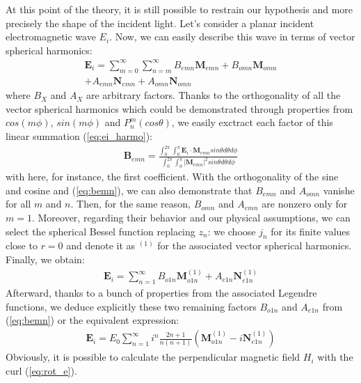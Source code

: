 \documentclass{article}
\numberwithin{equation}{section}
\begin{document}
At this point of the theory, it is still possible to restrain our hypothesis and more precisely the shape of the incident light. Let's consider a planar incident electromagnetic wave $E_{i}$. Now, we can easily describe this wave in terms of vector spherical harmonics:
\begin{equation}\label{eq:ei_harmo}
\begin{aligned}
\textbf{E}_{i}=\sum_{m=0}^{\infty }\sum_{n=m}^{\infty }B_{emn}\textbf{M}_{emn}+B_{omn}\textbf{M}_{omn}\\
+A_{emn}\textbf{N}_{emn}+A_{omn}\textbf{N}_{omn}
\end{aligned}
\end{equation}
where $B_{X}$ and $A_{X}$ are arbitrary factors. Thanks to the orthogonality of all the vector spherical harmonics which could be demonstrated through properties from $cos(m\phi)$, $sin(m\phi)$ and $P_{n}^{m}(cos\theta)$, we easily exctract each factor of this linear summation (\ref{eq:ei_harmo}):
\begin{align}\label{eq:bemn}
\textbf{B}_{emn}=\frac{\int_{0}^{2\pi}\int_{0}^{\pi}\textbf{E}_{i}\cdot \textbf{M}_{emn}sin\theta d\theta d\phi}{\int_{0}^{2\pi}\int_{0}^{\pi}|\textbf{M}_{emn}|^{2}sin\theta d\theta d\phi}
\end{align}
with here, for instance, the first coefficient. With the orthogonality of the sine and cosine and (\ref{eq:bemn}), we can also demonstrate that $B_{emn}$ and $A_{omn}$ vanishe for all $m$ and $n$. Then, for the same reason, $B_{omn}$ and $A_{emn}$ are nonzero only for $m=1$. Moreover, regarding their behavior and our physical assumptions, we can select the spherical Bessel function replacing $z_{n}$: we choose $j_{n}$ for its finite values close to $r=0$ and denote it as $^{(1)}$ for the associated vector spherical harmonics. Finally, we obtain:
\begin{align}
\textbf{E}_{i}=\sum_{n=1}^{\infty }B_{o1n}\textbf{M}^{(1)}_{o1n} + A_{e1n}\textbf{N}^{(1)}_{e1n}
\end{align}
Afterward, thanks to a bunch of properties from the associated Legendre functions, we deduce explicitly these two remaining factors $B_{o1n}$ and $A_{e1n}$ from (\ref{eq:bemn}) or the equivalent expression:
\begin{align}
\textbf{E}_{i}=E_{0}\sum_{n=1}^{\infty }i^{n}\frac{2n+1}{n(n+1)}(\textbf{M}^{(1)}_{o1n} - i\textbf{N}^{(1)}_{e1n})
\end{align}
Obviously, it is possible to calculate the perpendicular magnetic field $H_{i}$ with the curl (\ref{eq:rot_e}).
\end{document}
